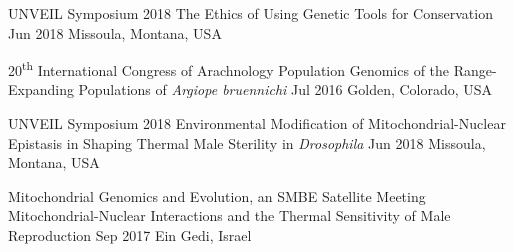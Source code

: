 
\begin{cventries}

  \cvpresentation
    {UNVEIL Symposium 2018}
    {The Ethics of Using Genetic Tools for Conservation}
    {Jun 2018}
    {Missoula, Montana, USA} 

  \cvpresentation
    {20\textsuperscript{th} International Congress of Arachnology} %
    {Population Genomics of the Range-Expanding Populations of \textit{Argiope bruennichi}} %
     {Jul 2016} %
    {Golden, Colorado, USA} %
   
\end{cventries}

\vspace{\baselineskip}
\vspace{-1mm}


\begin{cventries}

  \cvpresentation
    {UNVEIL Symposium 2018} %
    {Environmental Modification of Mitochondrial-Nuclear Epistasis in Shaping Thermal Male Sterility in \textit{Drosophila}} %
    {Jun 2018} %
    {Missoula, Montana, USA} %
    
   \cvpresentation
    {Mitochondrial Genomics and Evolution, an SMBE Satellite Meeting}
    {Mitochondrial-Nuclear Interactions and the Thermal Sensitivity of Male Reproduction}
    {Sep 2017}
    {Ein Gedi, Israel}
    
\end{cventries}

\vspace{\baselineskip}
\vspace{-1mm}


